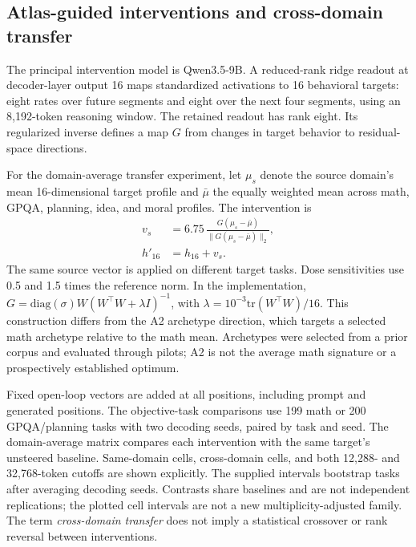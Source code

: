 \subsection{Atlas-guided interventions and cross-domain transfer}
The principal intervention model is Qwen3.5-9B. A reduced-rank ridge readout at decoder-layer output 16 maps standardized activations to 16 behavioral targets: eight rates over future segments and eight over the next four segments, using an 8,192-token reasoning window. The retained readout has rank eight. Its regularized inverse defines a map $G$ from changes in target behavior to residual-space directions.

For the domain-average transfer experiment, let $\mu_s$ denote the source domain's mean 16-dimensional target profile and $\bar\mu$ the equally weighted mean across math, GPQA, planning, idea, and moral profiles. The intervention is
\begin{equation}
\begin{aligned}
v_s&=6.75\,\frac{G(\mu_s-\bar\mu)}{\|G(\mu_s-\bar\mu)\|_2},\\
h'_{16}&=h_{16}+v_s.
\end{aligned}
\end{equation}
The same source vector is applied on different target tasks. Dose sensitivities use 0.5 and 1.5 times the reference norm. In the implementation, $G=\mathrm{diag}(\sigma)W(W^\top W+\lambda I)^{-1}$, with $\lambda=10^{-3}\mathrm{tr}(W^\top W)/16$. This construction differs from the A2 archetype direction, which targets a selected math archetype relative to the math mean. Archetypes were selected from a prior corpus and evaluated through pilots; A2 is not the average math signature or a prospectively established optimum.

Fixed open-loop vectors are added at all positions, including prompt and generated positions. The objective-task comparisons use 199 math or 200 GPQA/planning tasks with two decoding seeds, paired by task and seed. The domain-average matrix compares each intervention with the same target's unsteered baseline. Same-domain cells, cross-domain cells, and both 12,288- and 32,768-token cutoffs are shown explicitly. The supplied intervals bootstrap tasks after averaging decoding seeds. Contrasts share baselines and are not independent replications; the plotted cell intervals are not a new multiplicity-adjusted family. The term \emph{cross-domain transfer} does not imply a statistical crossover or rank reversal between interventions.

